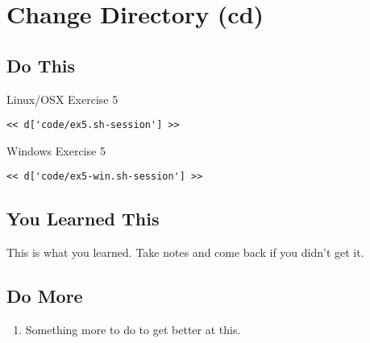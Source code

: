 \chapter{Change Directory (cd)}

\section{Do This}

\begin{code}{Linux/OSX Exercise 5}
\begin{Verbatim}
<< d['code/ex5.sh-session'] >>
\end{Verbatim}
\end{code}

\begin{code}{Windows Exercise 5}
\begin{Verbatim}
<< d['code/ex5-win.sh-session'] >>
\end{Verbatim}
\end{code}

\section{You Learned This}

This is what you learned.  Take notes and come back if you didn't get it.

\section{Do More}

\begin{enumerate}
\item Something more to do to get better at this.
\end{enumerate}

